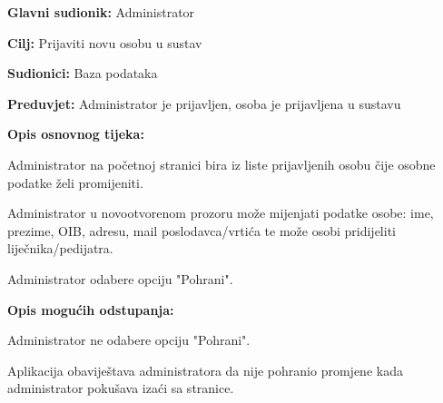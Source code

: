 					\noindent {}
					\begin{packed_item}
						
						\item \textbf{Glavni sudionik: }Administrator
						\item  \textbf{Cilj:} Prijaviti novu osobu u sustav
						\item  \textbf{Sudionici:} Baza podataka
						\item  \textbf{Preduvjet:} Administrator je prijavljen, osoba je prijavljena u sustavu
						\item  \textbf{Opis osnovnog tijeka:}
						
						\item[] \begin{packed_enum}
							
							\item Administrator na početnoj stranici bira iz liste prijavljenih osobu čije osobne podatke želi promijeniti.
							\item Administrator u novootvorenom prozoru može mijenjati podatke osobe: ime, prezime, OIB, adresu, mail poslodavca/vrtića te može osobi pridijeliti liječnika/pedijatra.
							\item Administrator odabere opciju "Pohrani".
						\end{packed_enum}
						
						\item  \textbf{Opis mogućih odstupanja:}
						
						\item[] \begin{packed_item}
							
							\item[3.a] Administrator ne odabere opciju "Pohrani".
							\item[] \begin{packed_enum}
								
								\item Aplikacija obaviještava administratora da nije pohranio promjene kada administrator pokušava izaći sa stranice.
							\end{packed_enum}
							
							
						\end{packed_item}
						
						
					\end{packed_item}
					
					
				
